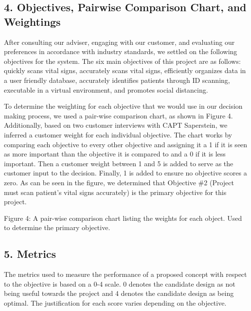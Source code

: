 ﻿\documentclass[10pt]{article}
\begin{document}
\subsection{4. Objectives, Pairwise Comparison Chart, and Weightings}
        After consulting our adviser, engaging with our customer, and evaluating our preferences in accordance with industry standards, we settled on the following objectives for the system. The six main objectives of this project are as follows: quickly scans vital signs, accurately scans vital signs, efficiently organizes data in a user friendly database, accurately identifies patients through ID scanning, executable in a virtual environment, and promotes social distancing. 
        
        To determine the weighting for each objective that we would use in our decision making process, we used a pair-wise comparison chart, as shown in Figure 4. Additionally, based on two customer interviews with CAPT Saperstein, we inferred a customer weight for each individual objective. The chart works by comparing each objective to every other objective and assigning it a 1 if it is seen as more important than the objective it is compared to and a 0 if it is less important. Then a customer weight between 1 and 5 is added to serve as the customer input to the decision. Finally, 1 is added to ensure no objective scores a zero. As can be seen in the figure, we determined that Objective \#2 (Project must scan patient’s vital signs accurately) is the primary objective for this project. 

%
	
Figure 4: A pair-wise comparison chart listing the weights for each object. Used to determine the primary objective. 
   
\subsection{5. Metrics}
        The metrics used to measure the performance of a proposed concept with respect to the objective is based on a 0-4 scale. 0 denotes the candidate design as not being useful towards the project and 4 denotes the candidate design as being optimal. The justification for each score varies depending on the objective. 
%
%	
\end{document}
